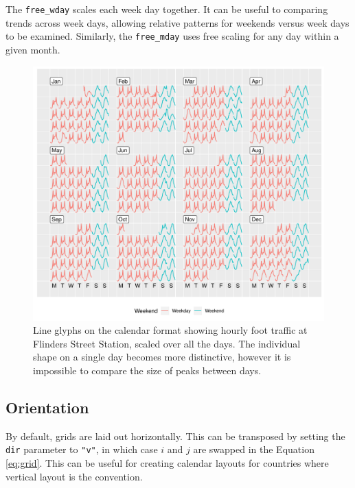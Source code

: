 \documentclass[12pt]{article}
\begin{document}
The \texttt{free\_wday} scales each week day together. It can be useful
to comparing trends across week days, allowing relative patterns for
weekends versus week days to be examined. Similarly, the
\texttt{free\_mday} uses free scaling for any day within a given month.

\begin{figure}

{\centering \includegraphics[width=\textwidth]{figure/flinders-free-1} 

}

\caption{Line glyphs on the calendar format showing hourly foot traffic at Flinders Street Station, scaled over all the days. The individual shape on a single day becomes more distinctive, however it is impossible to compare the size of peaks between days.}\label{fig:flinders-free}
\end{figure}

\hypertarget{orientation}{%
\subsection{Orientation}\label{orientation}}

By default, grids are laid out horizontally. This can be transposed by
setting the \texttt{dir} parameter to \texttt{"v"}, in which case \(i\)
and \(j\) are swapped in the Equation \ref{eq:grid}. This can be useful
for creating calendar layouts for countries where vertical layout is the
convention.
\end{document}
